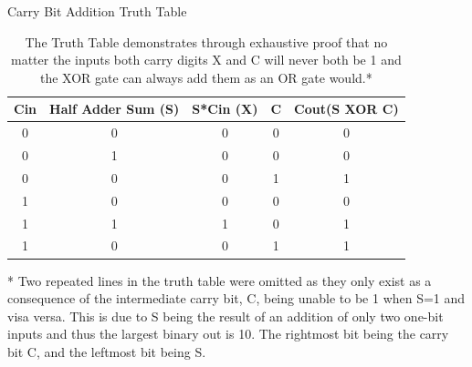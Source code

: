 \documentclass[11pt]{article}
\begin{document}
\begin{table}[!htb]\centering\caption{Carry Bit Addition Truth Table}\label{tbl:example_table}\begin{tabular}{c|c|c|c|c}\toprule Cin & Half Adder Sum (S) & S*Cin (X) & C & Cout(S XOR C) \\\midrule0 & 0 & 0 & 0 & 0  \\0 & 1 & 0 & 0 & 0 \\0 & 0 & 0 & 1 & 1 \\1 & 0 & 0 & 0 & 0 \\1 & 1 & 1 & 0 & 1 \\1 & 0 & 0 & 1 & 1 \\\bottomrule\end{tabular} \caption{The Truth Table demonstrates through exhaustive proof that no matter the inputs both carry digits X and C will never both be 1 and the XOR gate can always add them as an OR gate would.*}

* Two repeated lines in the truth table were omitted as they only exist as a consequence of the intermediate carry bit, C, being unable to be 1 when S=1 and visa versa. This is due to S being the result of an addition of only two one-bit inputs and thus the largest binary out is 10. The rightmost bit being the carry bit C, and the leftmost bit being S. 
\end{table}
\end{document}
